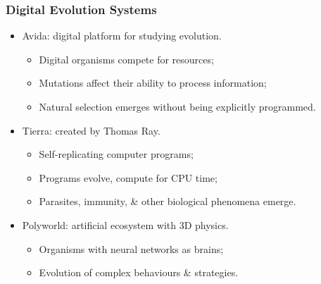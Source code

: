\documentclass[a4paper,11pt]{article}
\begin{document}
\subsubsection{Digital Evolution Systems}
\begin{itemize}
    \item   Avida: digital platform for studying evolution.
            \begin{itemize}
                \item   Digital organisms compete for resources;
                \item   Mutations affect their ability to process information;
                \item   Natural selection emerges without being explicitly programmed.
            \end{itemize}

    \item   Tierra: created by Thomas Ray.
            \begin{itemize}
                \item   Self-replicating computer programs;
                \item   Programs evolve, compute for CPU time;
                \item   Parasites, immunity, \&  other biological phenomena emerge.
            \end{itemize}

    \item   Polyworld: artificial ecosystem with 3D physics.
            \begin{itemize}
                \item   Organisms with neural networks as brains;
                \item   Evolution of complex behaviours \& strategies.
            \end{itemize}
\end{itemize}
\end{document}
